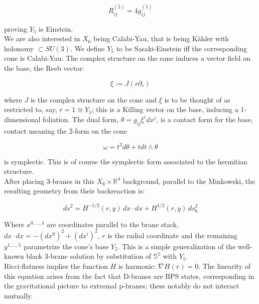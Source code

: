 \documentclass[11pt,a4paper,oneside,openright,titlepage]{book}
\begin{document}
\begin{equation}
	R^{(5)}_{ij} = 4 g_{ij}^{(5)}
\end{equation}

proving $Y_5$ is Einstein.\\

We are also interested in $X_6$ being Calabi-Yau, that is being K\"ahler with holonomy $\subset SU(3)$. We define $Y_5$ to be Sasaki-Einstein iff the corresponding cone is Calabi-Yau. The complex structure on the cone induces a vector field on the base, the Reeb vector:%

\begin{equation}
	\xi := J (r \partial_r)
\end{equation}

where $J$ is the complex structure on the cone and $\xi$ is to be thought of as restricted to, say, ${r=1} \cong Y_5$; this is a Killing vector on the base, inducing a 1-dimensional foliation. The dual form, $\theta = g_{ij} \xi^i dx^j$, is a contact form for the base, contact meaning the 2-form on the cone

\begin{equation}
	\omega = t^2 d\theta + t dt \wedge \theta
\end{equation}

is symplectic. This is of course the symplectic form associated to the hermitian structure.\\

After placing 3-branes in this $X_6 \times \mathbb{R}^4$ background, parallel to the Minkowski, the resulting geometry from their backreaction is:

\begin{equation}
ds^2 = H^{-1/2}(r,y) \, dx\cdot dx + H^{1/2}(r,y) \, ds_6^2
\end{equation}

Where $x^{0,\ldots,3}$ are coordinates parallel to the brane stack, $dx\cdot dx = -(dx^0)^2 + (dx^i)^2$, $r$ is the radial coordinate and the remaining $y^{1,\ldots,5}$ parametrize the cone's base $Y_5$. This is a simple generalization of the well-known black 3-brane solution by substitution of $\mathbb{S}^5$ with $Y_5$.\\

Ricci-flatness implies the function $H$ is harmonic: $\nabla H(r) = 0$. The linearity of this equation arises from the fact that D-branes are BPS states, corresponding in the gravitational picture to extremal p-branes; these notably do not interact mutually.\\
\end{document}
